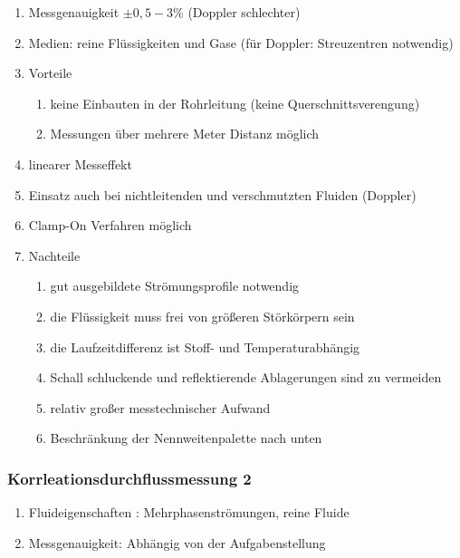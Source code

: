\documentclass[a4paper]{scrartcl}
\begin{document}
\begin{enumerate}
\item Messgenauigkeit $\pm 0,5 - 3 \%$ (Doppler schlechter)
\item Medien: reine Flüssigkeiten und Gase (für Doppler: Streuzentren notwendig)
\item Vorteile
    \begin{enumerate}
    \item keine Einbauten in der Rohrleitung (keine Querschnittsverengung)
    \item Messungen über mehrere Meter Distanz möglich
    \end{enumerate}
\item linearer Messeffekt
\item Einsatz auch bei nichtleitenden und verschmutzten Fluiden (Doppler)
\item Clamp-On Verfahren möglich
\item Nachteile
    \begin{enumerate}
    \item gut ausgebildete Strömungsprofile notwendig
    \item die Flüssigkeit muss frei von größeren Störkörpern sein
    \item die Laufzeitdifferenz ist Stoff- und Temperaturabhängig
    \item Schall schluckende und reflektierende Ablagerungen sind zu vermeiden
    \item relativ großer messtechnischer Aufwand
    \item Beschränkung der Nennweitenpalette nach unten
    \end{enumerate}
\end{enumerate}

\subsubsection{Korrleationsdurchflussmessung 2}
\begin{enumerate}
\item Fluideigenschaften : Mehrphasenströmungen, reine Fluide
\item Messgenauigkeit: Abhängig von der Aufgabenstellung
\end{enumerate}
\end{document}
